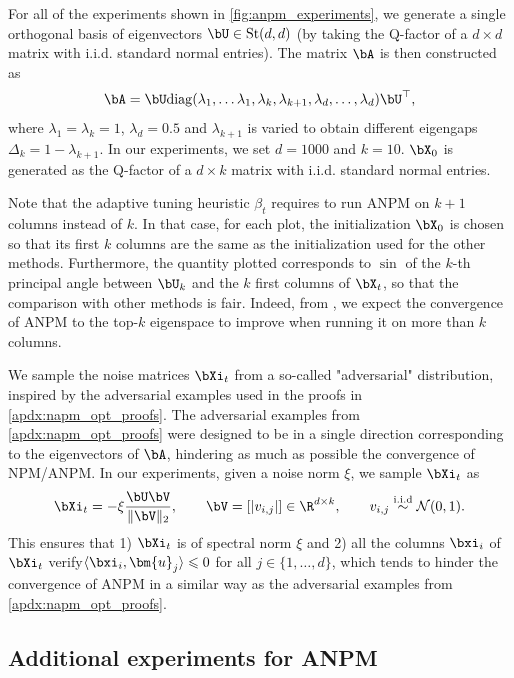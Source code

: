 \documentclass{article}
\theoremstyle{plain}
\theoremstyle{definition}
\theoremstyle{remark}
\begin{document}
For all of the experiments shown in \cref{fig:anpm_experiments}, we generate a single orthogonal basis of eigenvectors $\bU \in \mathrm{St}(d,d)$ (by taking the Q-factor of a $d\times d$ matrix with i.i.d. standard normal entries). The matrix $\bA$ is then constructed as
\begin{align*}
  \bA = \bU \mathrm{diag}(\lambda_1,\dots\lambda_1,\lambda_k,\lambda_{k+1},\lambda_d,\dots,\lambda_d) \bU^\top,
\end{align*}
where $\lambda_1 = \lambda_k = 1$, $\lambda_d = 0.5$ and $\lambda_{k+1}$ is varied to obtain different eigengaps $\Delta_k = 1-\lambda_{k+1}$. In our experiments, we set $d=1000$ and $k=10$. $\bX_0$ is generated as the Q-factor of a $d\times k$ matrix with i.i.d. standard normal entries. 

Note that the adaptive tuning heuristic $\beta_t$ requires to run ANPM on $k+1$ columns instead of $k$. In that case, for each plot, the initialization $\bX_0$ is chosen so that its first $k$ columns are the same as the initialization used for the other methods. Furthermore, the quantity plotted corresponds to $\sin$ of the $k$-th principal angle between $\bU_k$ and the $k$ first columns of $\bX_t$, so that the comparison with other methods is fair. Indeed, from \cite{balcan2016,xu2023anpm}, we expect the convergence of ANPM to the top-$k$ eigenspace to improve when running it on more than $k$ columns.

We sample the noise matrices $\bXi_t$ from a so-called "adversarial" distribution, inspired by the adversarial examples used in the proofs in \cref{apdx:napm_opt_proofs}. The adversarial examples from \cref{apdx:napm_opt_proofs} were designed to be in a single direction corresponding to the eigenvectors of $\bA$, hindering as much as possible the convergence of NPM/ANPM. In our experiments, given a noise norm $\xi$, we sample $\bXi_t$ as
\begin{align*}
  \bXi_t = -\xi \frac{\bU\bV}{\Vert\bV\Vert_2}, \qquad \bV = [\vert v_{i,j}\vert] \in \R^{d\times k}, \qquad v_{i,j} \stackrel{\mathrm{i.i.d}}{\sim} \mathcal{N}(0, 1).
\end{align*}
This ensures that 1) $\bXi_t$ is of spectral norm $\xi$ and 2) all the columns $\bxi_i$ of $\bXi_t$ verify$\langle\bxi_i, \bm{u}_j\rangle \leqslant 0$ for all $j\in\{1,\dots,d\}$, which tends to hinder the convergence of ANPM in a similar way as the adversarial examples from \cref{apdx:napm_opt_proofs}. 

\subsection{Additional experiments for ANPM}
\end{document}
